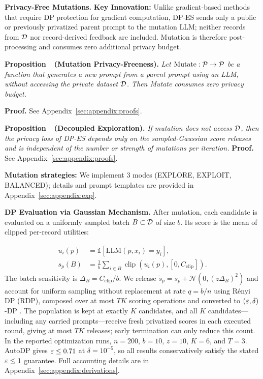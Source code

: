 \noindent\textbf{Privacy-Free Mutations.}
\textbf{Key Innovation:} Unlike gradient-based methods that require DP protection for gradient computation, DP-ES sends only a public or previously privatized parent prompt to the mutation LLM; neither records from $\mathcal{D}$ nor record-derived feedback are included. Mutation is therefore post-processing and consumes zero additional privacy budget.

\label{prop:mutation-free}
\noindent\textbf{Proposition~\thetheorem\ (Mutation Privacy-Freeness).}
\textit{Let $\text{Mutate}: \mathcal{P} \to \mathcal{P}$ be a function that generates a new prompt from a parent prompt using an LLM, without accessing the private dataset $\mathcal{D}$. Then Mutate consumes zero privacy budget.}

\noindent\textbf{Proof.} See Appendix~\ref*{sec:appendix:proofs}.

\label{prop:decoupled}
\noindent\textbf{Proposition~\thetheorem\ (Decoupled Exploration).}
\textit{If mutation does not access $\mathcal{D}$, then the privacy loss of DP-ES depends only on the sampled-Gaussian score releases and is independent of the number or strength of mutations per iteration.}
\noindent\textbf{Proof.} See Appendix~\ref*{sec:appendix:proofs}.

\noindent \textbf{Mutation strategies:} We implement 3 modes (EXPLORE, EXPLOIT, BALANCED); details and prompt templates are provided in Appendix~\ref*{sec:appendix:exp}.

\noindent\textbf{DP Evaluation via Gaussian Mechanism.}
After mutation, each candidate is evaluated on a uniformly sampled batch $B\subset\mathcal{D}$ of size $b$. Its score is the mean of clipped per-record utilities:


\vspace{-1em}
\begin{equation}
\begin{aligned}
u_i(p) &= \mathbb{1}[\text{LLM}(p,x_i)=y_i],\\
s_p(B) &= \tfrac{1}{b}\sum_{i\in B}\operatorname{clip}(u_i(p),[0,C_{\text{clip}}]).
\end{aligned}
\end{equation}
The batch sensitivity is $\Delta_B=C_{\text{clip}}/b$. We release $\tilde{s}_p=s_p+\mathcal{N}(0,(z\Delta_B)^2)$ and account for uniform sampling without replacement at rate $q=b/n$ using R\'enyi DP (RDP), composed over at most $TK$ scoring operations and converted to $(\varepsilon,\delta)$-DP \cite{wang2019subsampled}. The population is kept at exactly $K$ candidates, and all $K$ candidates---including any carried prompts---receive fresh privatized scores in each executed round, giving at most $TK$ releases; early termination can only reduce this count. In the reported optimization runs, $n{=}200$, $b{=}10$, $z{=}10$, $K{=}6$, and $T{=}3$. AutoDP gives $\varepsilon\leq0.71$ at $\delta=10^{-5}$, so all results conservatively satisfy the stated $\varepsilon\leq1$ guarantee. Full accounting details are in Appendix~\ref{sec:appendix:derivations}.

